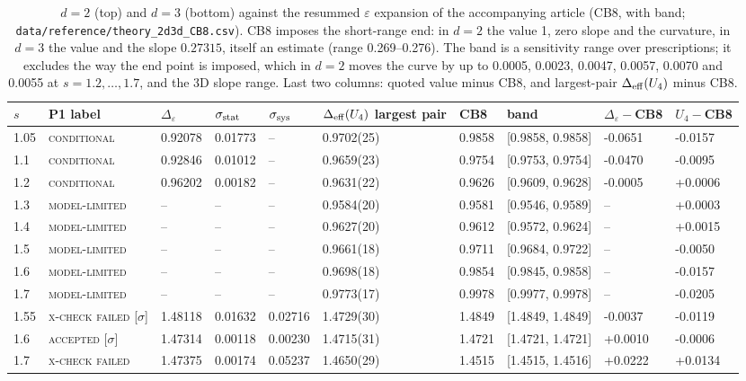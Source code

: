 \documentclass[10pt,a4paper]{article}
\newcommand{\De}{\Delta_\varepsilon}
\newcommand{\Deff}{\Delta_{\rm eff}}
\newcommand{\code}[1]{\texttt{#1}}
\newcommand{\lbl}[1]{{\mdseries\scshape #1}}
\newcommand{\sstat}{\sigma_{\rm stat}}
\newcommand{\ssys}{\sigma_{\rm sys}}
\begin{document}
\begin{table}[htbp]\centering\scriptsize
\caption{$d=2$ (top) and $d=3$ (bottom) against the resummed $\varepsilon$ expansion of the accompanying article (CB8, with band;
\code{data/reference/theory\_2d3d\_CB8.csv}). CB8 imposes the short-range end: in $d=2$ the value 1, zero slope and the curvature, in $d=3$
the value and the slope $0.27315$, itself an estimate (range 0.269--0.276). The band is a sensitivity range over prescriptions; it excludes
the way the end point is imposed, which in $d=2$ moves the curve by up to 0.0005, 0.0023, 0.0047, 0.0057, 0.0070 and 0.0055 at
$s=1.2,\dots,1.7$, and the 3D slope range. Last two columns: quoted value minus CB8, and largest-pair $\Deff(U_4)$ minus CB8.}\label{tab:theory23}
\setlength{\tabcolsep}{4.5pt}\begin{tabular}{@{}llllllllll@{}}\toprule
$s$ & P1 label & $\De$ & $\sstat$ & $\ssys$ & $\Deff(U_4)$ largest pair & CB8 & band & $\De-$CB8 & $U_4-$CB8 \\\midrule
1.05 & \lbl{conditional} & 0.92078 & 0.01773 & -- & 0.9702(25) & 0.9858 & [0.9858, 0.9858] & -0.0651 & -0.0157 \\
1.1 & \lbl{conditional} & 0.92846 & 0.01012 & -- & 0.9659(23) & 0.9754 & [0.9753, 0.9754] & -0.0470 & -0.0095 \\
1.2 & \lbl{conditional} & 0.96202 & 0.00182 & -- & 0.9631(22) & 0.9626 & [0.9609, 0.9628] & -0.0005 & +0.0006 \\
1.3 & \lbl{model-limited} & -- & -- & -- & 0.9584(20) & 0.9581 & [0.9546, 0.9589] & -- & +0.0003 \\
1.4 & \lbl{model-limited} & -- & -- & -- & 0.9627(20) & 0.9612 & [0.9572, 0.9624] & -- & +0.0015 \\
1.5 & \lbl{model-limited} & -- & -- & -- & 0.9661(18) & 0.9711 & [0.9684, 0.9722] & -- & -0.0050 \\
1.6 & \lbl{model-limited} & -- & -- & -- & 0.9698(18) & 0.9854 & [0.9845, 0.9858] & -- & -0.0157 \\
1.7 & \lbl{model-limited} & -- & -- & -- & 0.9773(17) & 0.9978 & [0.9977, 0.9978] & -- & -0.0205 \\
\midrule
1.55 & \lbl{x-check failed} [$\sigma$] & 1.48118 & 0.01632 & 0.02716 & 1.4729(30) & 1.4849 & [1.4849, 1.4849] & -0.0037 & -0.0119 \\
1.6 & \lbl{accepted} [$\sigma$] & 1.47314 & 0.00118 & 0.00230 & 1.4715(31) & 1.4721 & [1.4721, 1.4721] & +0.0010 & -0.0006 \\
1.7 & \lbl{x-check failed} & 1.47375 & 0.00174 & 0.05237 & 1.4650(29) & 1.4515 & [1.4515, 1.4516] & +0.0222 & +0.0134 \\

\end{tabular}
\end{table}
\end{document}
